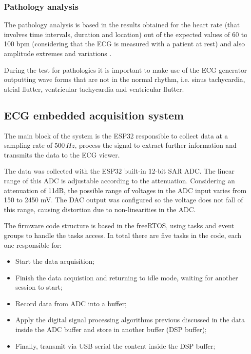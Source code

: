 \subsubsection{Pathology analysis}

The pathology analysis is based in the results obtained for the heart rate (that involves time intervals, duration and location) out of the expected values of 60 to 100 bpm (considering that the ECG is measured with a patient at rest) and also amplitude extremes and variations \cite{kherabnormality, stuchilin2017use, clevelandclinic}.

During the test for pathologies it is important to make use of the ECG generator outputting wave forms that are not in the normal rhythm, i.e. sinus tachycardia, atrial flutter, ventricular tachycardia and ventricular flutter.

\subsection{ECG embedded acquisition system}

The main block of the system is the ESP32 responsible to collect data at a sampling rate of $500 \, Hz$, process the signal to extract further information and transmits the data to the ECG viewer.

The data was collected with the ESP32 built-in 12-bit SAR ADC. The linear range of this ADC is adjustable according to the attenuation. Considering an attenuation of 11dB, the possible range of voltages in the ADC input varies from 150 to 2450 mV. The DAC output was configured so the voltage does not fall of this range, causing distortion due to non-linearities in the ADC.

The firmware code structure is based in the freeRTOS, using tasks and event groups to handle the tasks access. In total there are five tasks in the code, each one responsible for:

\begin{itemize}
    \item Start the data acquisition;
    \item Finish the data acquistion and returning to idle mode, waiting for another session to start;
    \item Record data from ADC into a buffer;
    \item Apply the digital signal processing algorithms previous discussed in the data inside the ADC buffer and store in another buffer (DSP buffer);
    \item Finally, transmit via USB serial the content inside the DSP buffer;
\end{itemize}

